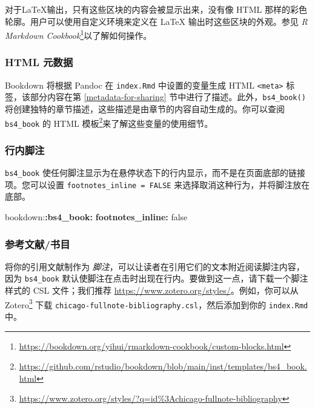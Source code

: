 \documentclass[
  12pt,
]{krantz}
\newenvironment{Shaded}{\begin{snugshade}}{\end{snugshade}}
\newcommand{\AttributeTok}[1]{\textcolor[rgb]{0.13,0.29,0.53}{#1}}
\newcommand{\CharTok}[1]{\textcolor[rgb]{0.31,0.60,0.02}{#1}}
\newcommand{\FunctionTok}[1]{\textcolor[rgb]{0.13,0.29,0.53}{\textbf{#1}}}
\newcommand{\KeywordTok}[1]{\textcolor[rgb]{0.13,0.29,0.53}{\textbf{#1}}}
\renewcommand{\href}[2]{#2\footnote{\url{#1}}}
\theoremstyle{definition}
\theoremstyle{definition}
\theoremstyle{definition}
\theoremstyle{definition}
\theoremstyle{remark}
\begin{document}
对于LaTeX输出，只有这些区块的内容会被显示出来，没有像 HTML 那样的彩色轮廓。用户可以使用自定义环境来定义在 LaTeX 输出时这些区块的外观。参见 \href{https://bookdown.org/yihui/rmarkdown-cookbook/custom-blocks.html}{\emph{R Markdown Cookbook}}以了解如何操作。

\hypertarget{html-ux5143ux6570ux636e}{%
\subsubsection{HTML 元数据}\label{html-ux5143ux6570ux636e}}

Bookdown 将根据 Pandoc 在 \texttt{index.Rmd} 中设置的变量生成 HTML \texttt{\textless{}meta\textgreater{}} 标签，该部分内容在第 \ref{metadata-for-sharing} 节中进行了描述。此外，\texttt{bs4\_book()} 将创建独特的章节描述，这些描述是由章节的内容自动生成的。你可以查阅 \href{https://github.com/rstudio/bookdown/blob/main/inst/templates/bs4_book.html}{\texttt{bs4\_book} 的 HTML
模板}来了解这些变量的使用细节。

\hypertarget{bs4-book-footnotes}{%
\subsubsection{行内脚注}\label{bs4-book-footnotes}}

\texttt{bs4\_book} 使任何脚注显示为在悬停状态下的行内显示，而不是在页面底部的链接项。您可以设置 \texttt{footnotes\_inline\ =\ FALSE} 来选择取消这种行为，并将脚注放在底部。

\begin{Shaded}
\begin{Highlighting}[]
\AttributeTok{bookdown:}\FunctionTok{:bs4\_book}\KeywordTok{:}
\AttributeTok{  }\FunctionTok{footnotes\_inline}\KeywordTok{:}\AttributeTok{ }\CharTok{false}
\end{Highlighting}
\end{Shaded}

\hypertarget{ux53c2ux8003ux6587ux732eux4e66ux76ee}{%
\subsubsection{参考文献/书目}\label{ux53c2ux8003ux6587ux732eux4e66ux76ee}}

将你的引用文献制作为 \emph{脚注}，可以让读者在引用它们的文本附近阅读脚注内容，因为 \texttt{bs4\_book} 默认使脚注在点击时出现在行内。要做到这一点，请下载一个脚注样式的 CSL 文件；我们推荐 \url{https://www.zotero.org/styles/}。例如，你可以从 \href{https://www.zotero.org/styles/?q=id\%3Achicago-fullnote-bibliography}{Zotero} 下载 \texttt{chicago-fullnote-bibliography.csl}，然后添加到你的 \texttt{index.Rmd} 中。
\end{document}

